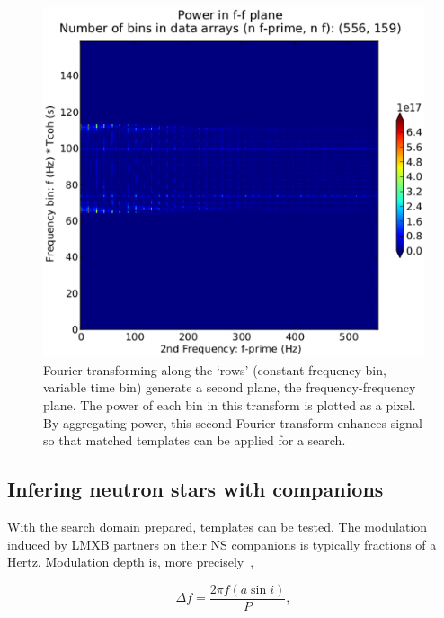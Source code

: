 \begin{figure}
\begin{center}
\includegraphics[trim=20 15 80 5, clip, width=0.7\paperwidth,height=0.35\paperheight]{ffplane-4e21-on-4e24.eps}
\caption{Fourier-transforming along the `rows' (constant frequency bin, variable time bin) generate a second plane, the frequency-frequency plane. The power of each bin in this transform is plotted as a pixel. By aggregating power, this second Fourier transform enhances signal so that matched templates can be applied for a search.}
\label{ffplane-figure}
\end{center}
\end{figure}

            \subsection{Infering neutron stars with companions}
            \label{inference}
 
With the search domain prepared, templates can be tested.
The modulation induced by LMXB partners on their NS companions is typically fractions of a Hertz.
Modulation depth is, more precisely~\cite{GoetzTwoSpectMethods2011},

\begin{equation}
\Delta f = \frac{2 \pi f (a \sin i)}{P},
\label{TwoSpect_mod_depth}
\end{equation}

